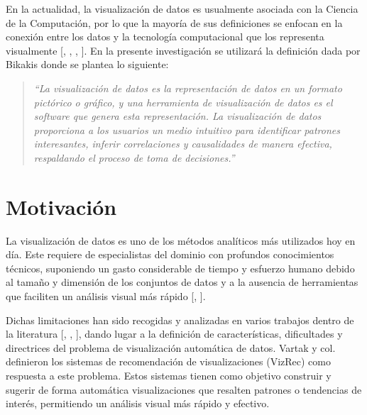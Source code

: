 En la actualidad, la visualizaci\'on de datos
es usualmente asociada con la Ciencia de la Computaci\'on, por lo que la mayor\'ia
de sus definiciones se enfocan en la conexi\'on entre los datos y la tecnolog\'ia
computacional que los representa visualmente 
[\cite*{card1999readings}, \cite*{friendly2001milestones}, \cite*{manovich2010visualization}, \cite*{kirk2012data}].
En la presente investigaci\'on se utilizar\'a la definici\'on dada por
Bikakis \cite{bikakis2018big} donde se plantea lo siguiente:\\
\begin{quotation}
    \textit{``La visualizaci\'on de datos es la representación de datos en un
    formato pictórico o gráfico, y una herramienta de visualización de
    datos es el software que genera esta representación. La visualización
    de datos proporciona a los usuarios un medio intuitivo para identificar patrones
    interesantes, inferir correlaciones y causalidades de manera efectiva,
    respaldando el proceso de toma de decisiones.''}
\end{quotation}


\section*{Motivaci\'on}


La visualizaci\'on de datos es uno de los m\'etodos
anal\'iticos m\'as utilizados hoy en d\'ia. Este requiere de especialistas
del dominio con profundos conocimientos t\'ecnicos, suponiendo un gasto
considerable de tiempo y esfuerzo humano debido al tama\~no y dimensi\'on
de los conjuntos de datos y a la ausencia de herramientas que faciliten un
an\'alisis visual m\'as r\'apido [\cite*{chen2012business}, \cite*{vartak2017towards}].

Dichas limitaciones han sido recogidas y analizadas en varios trabajos dentro de la
literatura [\cite*{zeng2021we}, \cite*{vartak2017towards}, \cite*{godfrey2016interactive}], 
dando lugar a la definici\'on de caracter\'isticas, dificultades y 
directrices del problema de visualizaci\'on autom\'atica de datos.
Vartak y col. \cite{vartak2017towards} definieron los sistemas de recomendaci\'on
de visualizaciones (VizRec) como respuesta a este problema. Estos sistemas tienen como
objetivo construir y sugerir de forma autom\'atica visualizaciones que resalten
patrones o tendencias de inter\'es, permitiendo un an\'alisis visual m\'as r\'apido
y efectivo.

